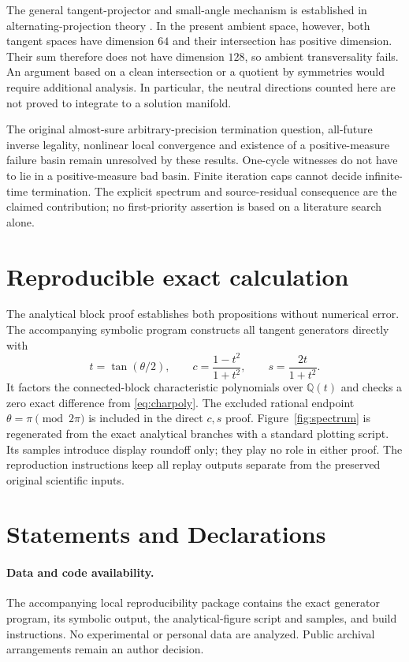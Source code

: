 \documentclass[11pt,a4paper]{article}
\begin{document}
The general tangent-projector and small-angle mechanism is established in alternating-projection theory \cite{LewisMalick2008}. In the present ambient space, however, both tangent spaces have dimension $64$ and their intersection has positive dimension. Their sum therefore does not have dimension $128$, so ambient transversality fails. An argument based on a clean intersection or a quotient by symmetries would require additional analysis. In particular, the neutral directions counted here are not proved to integrate to a solution manifold.

The original almost-sure arbitrary-precision termination question, all-future inverse legality, nonlinear local convergence and existence of a positive-measure failure basin remain unresolved by these results. One-cycle witnesses do not have to lie in a positive-measure bad basin. Finite iteration caps cannot decide infinite-time termination. The explicit spectrum and source-residual consequence are the claimed contribution; no first-priority assertion is based on a literature search alone.

\section{Reproducible exact calculation}

The analytical block proof establishes both propositions without numerical error. The accompanying symbolic program constructs all tangent generators directly with
\begin{equation}
 t=\tan(\theta/2),\qquad c=\frac{1-t^2}{1+t^2},\qquad
 s=\frac{2t}{1+t^2}.
\end{equation}
It factors the connected-block characteristic polynomials over $\mathbb Q(t)$ and checks a zero exact difference from \eqref{eq:charpoly}. The excluded rational endpoint $\theta=\pi\pmod{2\pi}$ is included in the direct $c,s$ proof. Figure~\ref{fig:spectrum} is regenerated from the exact analytical branches with a standard plotting script. Its samples introduce display roundoff only; they play no role in either proof. The reproduction instructions keep all replay outputs separate from the preserved original scientific inputs.

\section*{Statements and Declarations}

\paragraph{Data and code availability.}
The accompanying local reproducibility package contains the exact generator program, its symbolic output, the analytical-figure script and samples, and build instructions. No experimental or personal data are analyzed. Public archival arrangements remain an author decision.
\end{document}
